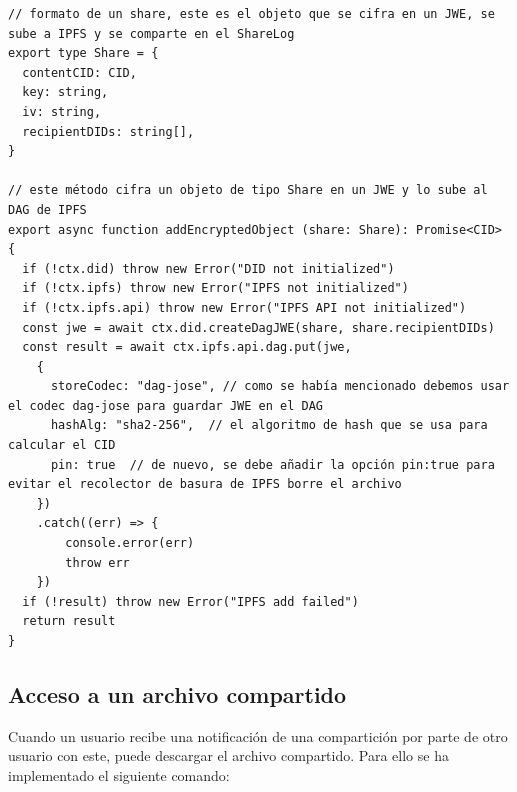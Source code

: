 \begin{verbatim}
// formato de un share, este es el objeto que se cifra en un JWE, se sube a IPFS y se comparte en el ShareLog
export type Share = {
  contentCID: CID,
  key: string,
  iv: string,
  recipientDIDs: string[],
}

// este método cifra un objeto de tipo Share en un JWE y lo sube al DAG de IPFS
export async function addEncryptedObject (share: Share): Promise<CID> {
  if (!ctx.did) throw new Error("DID not initialized")
  if (!ctx.ipfs) throw new Error("IPFS not initialized")
  if (!ctx.ipfs.api) throw new Error("IPFS API not initialized")
  const jwe = await ctx.did.createDagJWE(share, share.recipientDIDs)
  const result = await ctx.ipfs.api.dag.put(jwe, 
    {
      storeCodec: "dag-jose", // como se había mencionado debemos usar el codec dag-jose para guardar JWE en el DAG
      hashAlg: "sha2-256",  // el algoritmo de hash que se usa para calcular el CID
      pin: true  // de nuevo, se debe añadir la opción pin:true para evitar el recolector de basura de IPFS borre el archivo
    })
    .catch((err) => {
        console.error(err)
        throw err
    })
  if (!result) throw new Error("IPFS add failed")
  return result
}
\end{verbatim}

\subsection{Acceso a un archivo compartido}
Cuando un usuario recibe una notificación de una compartición por parte de otro usuario con este, puede descargar el archivo compartido. Para ello se ha implementado el siguiente comando:

